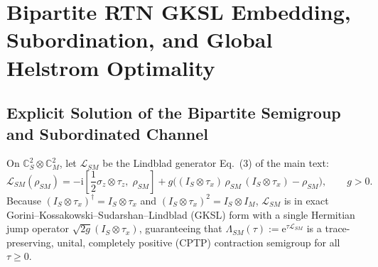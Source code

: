 \documentclass[onecolumn,10pt,notitlepage,amsmath,amssymb,floatfix]{revtex4-2}
\theoremstyle{plain}
\theoremstyle{definition}
\newcommand{\ii}{\mathrm{i}}
\newcommand{\ee}{\mathrm{e}}
\begin{document}
\maketitle
\tableofcontents

\section{Bipartite RTN GKSL Embedding, Subordination, and Global Helstrom Optimality}
\label{sec:S1}

\subsection{Explicit Solution of the Bipartite Semigroup and Subordinated Channel}

On $\mathbb{C}^2_S \otimes \mathbb{C}^2_M$, let $\mathcal{L}_{SM}$ be the Lindblad generator Eq.~(3) of the main text:
\begin{equation}
\label{eq:S1_L_SM}
\mathcal{L}_{SM}(\rho_{SM}) = -\ii\left[\frac{1}{2}\sigma_z \otimes \tau_z,\;\rho_{SM}\right]
+ g\Big((I_S \otimes \tau_x)\,\rho_{SM}\,(I_S \otimes \tau_x) - \rho_{SM}\Big), \qquad g > 0.
\end{equation}
Because $(I_S \otimes \tau_x)^\dagger = I_S \otimes \tau_x$ and $(I_S \otimes \tau_x)^2 = I_S \otimes I_M$, $\mathcal{L}_{SM}$ is in exact Gorini--Kossakowski--Sudarshan--Lindblad (GKSL) form with a single Hermitian jump operator $\sqrt{2g}(I_S \otimes \tau_x)$, guaranteeing that $\Lambda_{SM}(\tau) := \ee^{\tau\mathcal{L}_{SM}}$ is a trace-preserving, unital, completely positive (CPTP) contraction semigroup for all $\tau \ge 0$.
\end{document}
